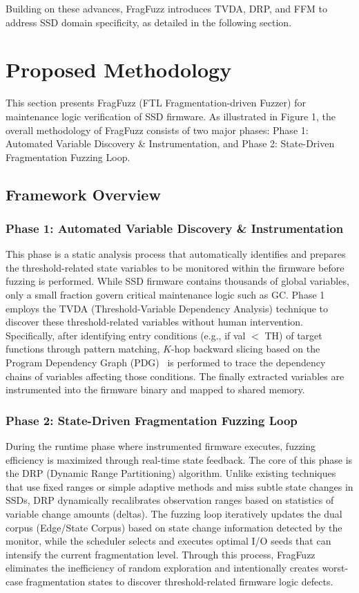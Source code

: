 \documentclass[conference]{IEEEtran}
\begin{document}
Building on these advances, FragFuzz introduces TVDA, DRP, and FFM to address SSD domain specificity, as detailed in the following section.

\section{Proposed Methodology}
This section presents FragFuzz (FTL Fragmentation-driven Fuzzer) for maintenance logic verification of SSD firmware.
As illustrated in Figure 1, the overall methodology of FragFuzz consists of two major phases: Phase 1: Automated Variable Discovery \& Instrumentation, and Phase 2: State-Driven Fragmentation Fuzzing Loop.

\subsection{Framework Overview}
\subsubsection*{Phase 1: Automated Variable Discovery \& Instrumentation}

This phase is a static analysis process that automatically identifies and prepares the threshold-related state variables to be monitored within the firmware before fuzzing is performed.
While SSD firmware contains thousands of global variables, only a small fraction govern critical maintenance logic such as GC.
Phase 1 employs the TVDA (Threshold-Variable Dependency Analysis) technique to discover these threshold-related variables without human intervention.
Specifically, after identifying entry conditions (e.g., if val $<$ TH) of target functions through pattern matching, $K$-hop backward slicing based on the Program Dependency Graph (PDG)~\cite{horwitz_pdg} is performed to trace the dependency chains of variables affecting those conditions.
The finally extracted variables are instrumented into the firmware binary and mapped to shared memory.

\subsubsection*{Phase 2: State-Driven Fragmentation Fuzzing Loop}

During the runtime phase where instrumented firmware executes, fuzzing efficiency is maximized through real-time state feedback.
The core of this phase is the DRP (Dynamic Range Partitioning) algorithm.
Unlike existing techniques that use fixed ranges or simple adaptive methods and miss subtle state changes in SSDs, DRP dynamically recalibrates observation ranges based on statistics of variable change amounts (deltas).
The fuzzing loop iteratively updates the dual corpus (Edge/State Corpus) based on state change information detected by the monitor, while the scheduler selects and executes optimal I/O seeds that can intensify the current fragmentation level.
Through this process, FragFuzz eliminates the inefficiency of random exploration and intentionally creates worst-case fragmentation states to discover threshold-related firmware logic defects.
\end{document}
